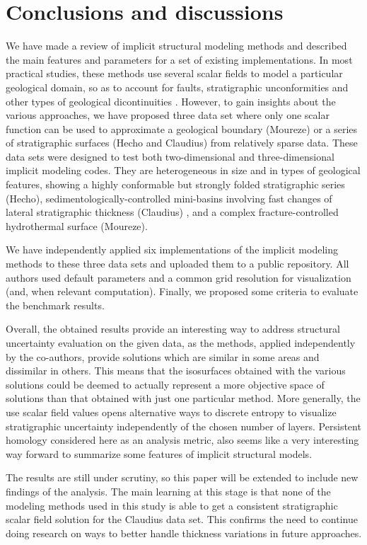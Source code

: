 \documentclass[preprint]{ring20}
\begin{document}
{\section*{Conclusions and discussions}
\label{sec:conclu}
We have made a review of implicit structural modeling methods and described the main features and parameters for a set of existing implementations. In most practical studies, these methods use several scalar fields to model a particular geological domain, so as to account for faults, stratigraphic unconformities and other types of geological dicontinuities \citep{Wellmann2018AiG}. However, to gain insights about the various approaches, we have proposed three data set where only one scalar function can be used to approximate a geological boundary (Moureze) or a series of stratigraphic surfaces (Hecho and Claudius) from relatively sparse data. 
These data sets were designed to test both two-dimensional and three-dimensional implicit modeling codes. They are heterogeneous in size and in types of geological features, showing a highly conformable but strongly folded stratigraphic series (Hecho), sedimentologically-controlled mini-basins involving fast changes of lateral stratigraphic thickness (Claudius) , and a complex fracture-controlled hydrothermal surface (Moureze). 

We have independently applied six implementations of the implicit modeling methods to these three data sets and uploaded them to a public repository. All authors used default parameters and a common grid resolution for visualization (and, when relevant computation). Finally, we proposed some criteria to evaluate the benchmark results. 

Overall, the obtained results provide an interesting way to address structural uncertainty evaluation on the given data, as the methods, applied independently by the co-authors, provide solutions which are similar in some areas and dissimilar in others. This means that the isosurfaces obtained with the various solutions could be deemed to actually represent a more objective space of solutions than that obtained with just one particular method. More generally, the use scalar field values opens alternative ways to discrete entropy to visualize stratigraphic uncertainty independently of the chosen number of layers. Persistent homology considered here as an analysis metric, also seems like a very interesting way forward to summarize some features of implicit structural models.  

The results are still under scrutiny, so this paper will be extended to include new findings of the analysis. The main learning at this stage is that none of the modeling methods used in this study is able to get a consistent stratigraphic scalar field solution for the Claudius data set. This confirms the need to continue doing research on ways to better handle thickness variations in future approaches. 

}
\end{document}
